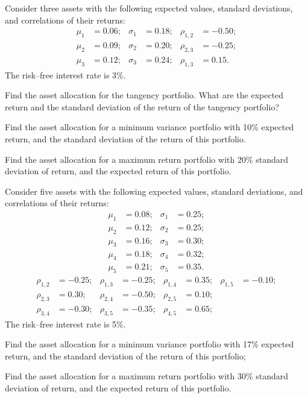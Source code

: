 \begin{exercises}
\item Consider three assets with the following expected values, standard
deviations, and correlations of their returns:
\[
\begin{aligned}
\mu_1 &= 0.06; & \sigma_1 &= 0.18; & \rho_{1,2} &= -0.50;\\
\mu_2 &= 0.09; & \sigma_2 &= 0.20; & \rho_{2,3} &= -0.25;\\
\mu_3 &= 0.12; & \sigma_3 &= 0.24; & \rho_{1,3} &= 0.15.
\end{aligned}
\]
The risk--free interest rate is 3\%.
\begin{subparts}
\item Find the asset allocation for the tangency portfolio. What are the
expected return and the standard deviation of the return of the tangency
portfolio?
\item Find the asset allocation for a minimum variance portfolio with 10\%
expected return, and the standard deviation of the return of this portfolio.
\item Find the asset allocation for a maximum return portfolio with 20\%
standard deviation of return, and the expected return of this portfolio.
\end{subparts}

\item Consider five assets with the following expected values, standard
deviations, and correlations of their returns:
\[
\begin{aligned}
\mu_1 &= 0.08; & \sigma_1 &= 0.25;\\
\mu_2 &= 0.12; & \sigma_2 &= 0.25;\\
\mu_3 &= 0.16; & \sigma_3 &= 0.30;\\
\mu_4 &= 0.18; & \sigma_4 &= 0.32;\\
\mu_5 &= 0.21; & \sigma_5 &= 0.35.
\end{aligned}
\]
\[
\begin{aligned}
\rho_{1,2} &= -0.25; & \rho_{1,3} &= -0.25; & \rho_{1,4} &= 0.35; & \rho_{1,5} &= -0.10;\\
\rho_{2,3} &= 0.30; & \rho_{2,4} &= -0.50; & \rho_{2,5} &= 0.10;\\
\rho_{3,4} &= -0.30; & \rho_{3,5} &= -0.35; & \rho_{4,5} &= 0.65;
\end{aligned}
\]
The risk--free interest rate is 5\%.
\begin{subparts}
\item Find the asset allocation for a minimum variance portfolio with 17\%
expected return, and the standard deviation of the return of this portfolio;
\item Find the asset allocation for a maximum return portfolio with 30\%
standard deviation of return, and the expected return of this portfolio.
\end{subparts}


\end{exercises}
